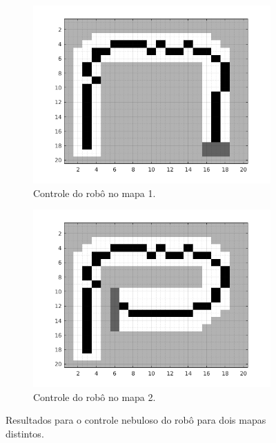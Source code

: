 	\begin{figure}[h!]
	
	\centering
	
		\begin{subfigure}{.5\textwidth}
		  \centering
		  \includegraphics[width=1\linewidth]{image/test1}
		  \caption{\centering Controle do robô no mapa 1.}
		  \label{fig:test_fuzzy_1}
		  
		\end{subfigure}%
		\begin{subfigure}{.5\textwidth}
		  \centering
		  \includegraphics[width=1\linewidth]{image/test2}
		  \caption{\centering Controle do robô no mapa 2.}
		  \label{fig:test_fuzzy_2} 
		\end{subfigure}
	
	
	\caption{Resultados para o controle nebuloso do robô
	para dois mapas distintos.}
	\end{figure} 
	
